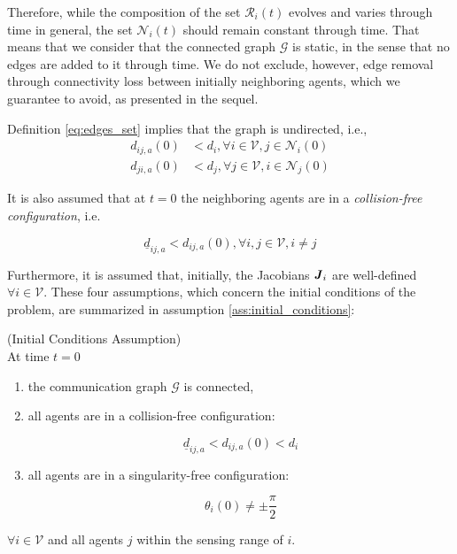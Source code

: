 Therefore, while the composition of the set $\mathcal{R}_i(t)$ evolves and
varies through time in general, the set $\mathcal{N}_i(t)$ should remain
constant through time. That means that we consider that the connected graph
$\mathcal{G}$ is static, in the sense that no edges are added to it through
time. We do not exclude, however, edge removal through connectivity loss between
initially neighboring agents, which we guarantee to avoid, as presented in the
sequel.

Definition \eqref{eq:edges_set} implies that the graph is undirected, i.e.,
\begin{align}
  d_{ij,a}(0) &< d_i, \forall i \in \mathcal{V}, j \in \mathcal{N}_i(0) \label{eq:initially_connected_0} \\
  d_{ji,a}(0) &< d_j, \forall j \in \mathcal{V}, i \in \mathcal{N}_j(0) \label{eq:initially_connected_1}
\end{align}

It is also assumed that at $t=0$ the neighboring agents are in a
\textit{collision-free configuration}, i.e.

\begin{equation}
  \underline{d}_{ij, a} < d_{ij,a}(0), \forall i,j \in \mathcal{V}, i \neq j
\label{eq:initially_coll_free}
\end{equation}

Furthermore, it is assumed that, initially, the Jacobians $\bm{\mathit{J}}_i$ are
well-defined $\forall i \in \mathcal{V}$. These four assumptions, which concern
the initial conditions of the problem, are summarized in assumption
\ref{ass:initial_conditions}:

\begin{gg_box}
\begin{assumption}(Initial Conditions Assumption)\\

  At time $t = 0$

  \begin{enumerate}

	  \item the communication graph $\mathcal{G}$ is connected,

    \item all agents are in a collision-free configuration:

      $$\underline{d}_{ij,a} < d_{ij,a}(0) < d_i$$

    \item all agents are in a singularity-free configuration:

      $$\theta_i(0) \neq \pm \frac{\pi}{2}$$

  \end{enumerate}
  $\forall i \in \mathcal{V}$ and all agents $j$ within the sensing range of $i$.
  \label{ass:initial_conditions}
\end{assumption}
\end{gg_box}


